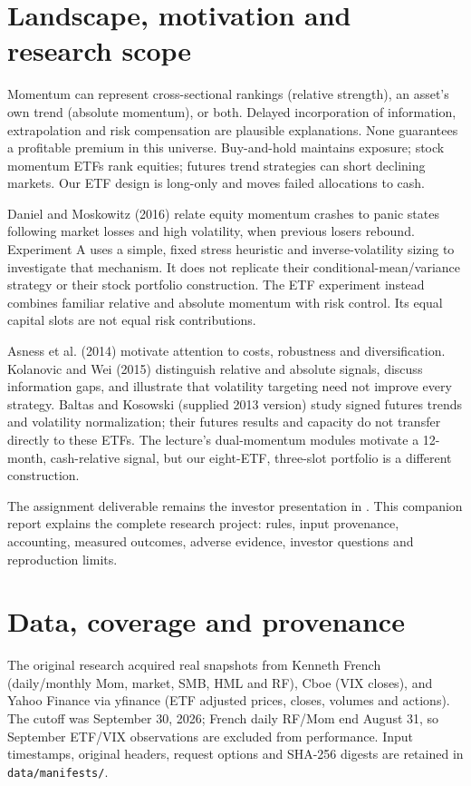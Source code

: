 \documentclass[11pt]{article}
\begin{document}
\section{Landscape, motivation and research scope}
Momentum can represent cross-sectional rankings (relative strength), an asset's own trend (absolute momentum), or both. Delayed incorporation of information, extrapolation and risk compensation are plausible explanations. None guarantees a profitable premium in this universe. Buy-and-hold maintains exposure; stock momentum ETFs rank equities; futures trend strategies can short declining markets. Our ETF design is long-only and moves failed allocations to cash.

Daniel and Moskowitz (2016) relate equity momentum crashes to panic states following market losses and high volatility, when previous losers rebound. Experiment A uses a simple, fixed stress heuristic and inverse-volatility sizing to investigate that mechanism. It does not replicate their conditional-mean/variance strategy or their stock portfolio construction. The ETF experiment instead combines familiar relative and absolute momentum with risk control. Its equal capital slots are not equal risk contributions.

Asness et al. (2014) motivate attention to costs, robustness and diversification. Kolanovic and Wei (2015) distinguish relative and absolute signals, discuss information gaps, and illustrate that volatility targeting need not improve every strategy. Baltas and Kosowski (supplied 2013 version) study signed futures trends and volatility normalization; their futures results and capacity do not transfer directly to these ETFs. The lecture's dual-momentum modules motivate a 12-month, cash-relative signal, but our eight-ETF, three-slot portfolio is a different construction.

The assignment deliverable remains the investor presentation in . This companion report explains the complete research project: rules, input provenance, accounting, measured outcomes, adverse evidence, investor questions and reproduction limits.
\section{Data, coverage and provenance}
The original research acquired real snapshots from Kenneth French (daily/monthly Mom, market, SMB, HML and RF), Cboe (VIX closes), and Yahoo Finance via yfinance (ETF adjusted prices, closes, volumes and actions). The cutoff was September 30, 2026; French daily RF/Mom end August 31, so September ETF/VIX observations are excluded from performance. Input timestamps, original headers, request options and SHA-256 digests are retained in \texttt{data/manifests/}.
\end{document}
